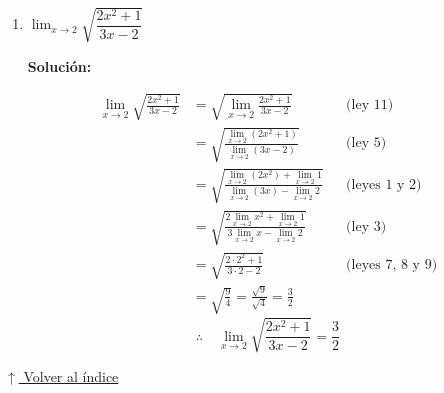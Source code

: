 \documentclass[12pt]{article}
\newcommand{\solucion}{%
    \vspace{0.8em}%
    \textbf{Solución:}%
}
\newcommand{\volverindice}{%
    \vspace{1em}%
    \begin{flushright}%
        \hyperlink{indice}{\small $\uparrow$ Volver al índice}%
    \end{flushright}%
}
\begin{document}
\begin{enumerate}[label=\alph*)]
    \solucion
    \begin{align*}
        \lim_{t\to2}\left(\frac{t^2-2}{t^3-3t+5}\right)^2
        &= \left[\lim_{t\to2}\left(\frac{t^2-2}{t^3-3t+5}\right)\right]^2 && \text{(ley 6)}\\
        &= \left[\frac{\lim_{t\to2}(t^2-2)}{\lim_{t\to2}(t^3-3t+5)}\right]^2 && \text{(ley 5)}\\
        &= \left[\frac{\lim_{t\to2}t^2 - \lim_{t\to2}2}{\lim_{t\to2}t^3 - \lim_{t\to2}3t + \lim_{t\to2}5}\right]^2 && \text{(leyes 1 y 2)}\\
        &= \left[\frac{\lim_{t\to2}t^2 - \lim_{t\to2}2}{\lim_{t\to2}t^3 - 3\lim_{t\to2}t + \lim_{t\to2}5}\right]^2 && \text{(ley 3)}\\
        &= \left[\frac{2^2 - 2}{2^3 - 3\cdot2 + 5}\right]^2 && \text{(leyes 7, 8 y 9)}\\
        &= \left[\frac{4-2}{8-6+5}\right]^2 = \left(\frac{2}{7}\right)^2 = \frac{4}{49}
    \end{align*}
    \[
        \therefore\quad \lim_{t\to2}\left(\frac{t^2-2}{t^3-3t+5}\right)^2 = \frac{4}{49}
    \]

    \newpage
    \item $\lim_{x \to 2}\sqrt{\dfrac{2x^2 + 1}{3x - 2}}$

    \solucion
    \begin{align*}
        \lim_{x\to2}\sqrt{\frac{2x^2+1}{3x-2}}
        &= \sqrt{\lim_{x\to2}\frac{2x^2+1}{3x-2}} && \text{(ley 11)}\\
        &= \sqrt{\frac{\lim_{x\to2}(2x^2+1)}{\lim_{x\to2}(3x-2)}} && \text{(ley 5)}\\
        &= \sqrt{\frac{\lim_{x\to2}(2x^2) + \lim_{x\to2}1}{\lim_{x\to2}(3x) - \lim_{x\to2}2}} && \text{(leyes 1 y 2)}\\
        &= \sqrt{\frac{2\lim_{x\to2}x^2 + \lim_{x\to2}1}{3\lim_{x\to2}x - \lim_{x\to2}2}} && \text{(ley 3)}\\
        &= \sqrt{\frac{2\cdot2^2 + 1}{3\cdot2 - 2}} && \text{(leyes 7, 8 y 9)}\\
        &= \sqrt{\frac{9}{4}} = \frac{\sqrt{9}}{\sqrt{4}} = \frac{3}{2}
    \end{align*}
    \[
        \therefore\quad \lim_{x\to2}\sqrt{\frac{2x^2+1}{3x-2}} = \frac{3}{2}
    \]
\end{enumerate}

\volverindice
\newpage

\end{document}
